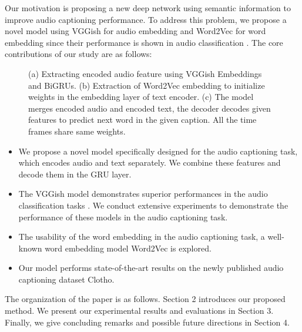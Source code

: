 \documentclass{article}
\begin{document}
Our motivation is proposing a new deep network using semantic information to improve audio captioning performance. To address this problem, we propose a novel model using VGGish \cite{7952132} for audio embedding and Word2Vec \cite{DBLP:journals/corr/MikolovSCCD13} for word embedding since their performance is shown in audio classification \cite{DBLP:journals/corr/abs-1905-01926}. The core contributions of our study are as follows:

\begin{figure*}[t]
	\centering
	\hspace{0.5cm}
		
	
	\caption{(a) Extracting encoded audio feature using VGGish Embeddings and BiGRUs. (b) Extraction of Word2Vec embedding to initialize weights in the embedding layer of text encoder. (c) The model merges encoded audio and encoded text, the decoder decodes given features to predict next word in the given caption. All the time frames share same weights.}\label{fig:dummy}
\end{figure*}

\begin{itemize}
	\item We propose a novel model specifically designed for the audio captioning task, which encodes audio and text separately. We combine these features and decode them in the GRU layer.
	\item The VGGish model demonstrates superior performances in the audio classification tasks \cite{7952132,DBLP:journals/corr/abs-1905-01926}. We conduct extensive experiments to demonstrate the performance of these models in the audio captioning task.	
	\item The usability of the word embedding in the audio captioning task, a well-known word embedding model Word2Vec is explored.
	\item Our model performs state-of-the-art results on the newly published audio captioning dataset Clotho. 
\end{itemize}
The organization of the paper is as follows. Section 2 introduces our proposed method. We present our experimental results and evaluations in Section 3. Finally, we give concluding remarks and possible future directions in Section 4.
\end{document}
